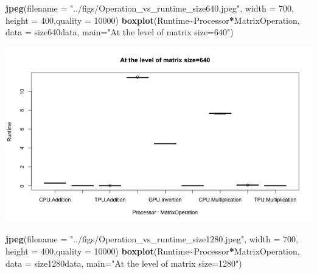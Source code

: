 \documentclass[
]{article}
\newenvironment{Shaded}{\begin{snugshade}}{\end{snugshade}}
\newcommand{\DataTypeTok}[1]{\textcolor[rgb]{0.13,0.29,0.53}{#1}}
\newcommand{\DecValTok}[1]{\textcolor[rgb]{0.00,0.00,0.81}{#1}}
\newcommand{\KeywordTok}[1]{\textcolor[rgb]{0.13,0.29,0.53}{\textbf{#1}}}
\newcommand{\NormalTok}[1]{#1}
\newcommand{\OperatorTok}[1]{\textcolor[rgb]{0.81,0.36,0.00}{\textbf{#1}}}
\newcommand{\StringTok}[1]{\textcolor[rgb]{0.31,0.60,0.02}{#1}}
\begin{document}
\begin{Shaded}
\begin{Highlighting}[]
\KeywordTok{jpeg}\NormalTok{(}\DataTypeTok{filename =} \StringTok{"../figs/Operation\_vs\_runtime\_size640.jpeg"}\NormalTok{, }\DataTypeTok{width =} \DecValTok{700}\NormalTok{, }\DataTypeTok{height =} \DecValTok{400}\NormalTok{,}\DataTypeTok{quality =} \DecValTok{10000}\NormalTok{)}
\KeywordTok{boxplot}\NormalTok{(Runtime}\OperatorTok{\textasciitilde{}}\NormalTok{Processor}\OperatorTok{*}\NormalTok{MatrixOperation, }\DataTypeTok{data =}\NormalTok{ size640data, }\DataTypeTok{main=}\StringTok{"At the level of matrix size=640"}\NormalTok{)}
\end{Highlighting}
\end{Shaded}

\begin{center}\includegraphics[width=0.9\linewidth]{../figs/Operation_vs_runtime_size640} \end{center}

\begin{Shaded}
\begin{Highlighting}[]
\KeywordTok{jpeg}\NormalTok{(}\DataTypeTok{filename =} \StringTok{"../figs/Operation\_vs\_runtime\_size1280.jpeg"}\NormalTok{, }\DataTypeTok{width =} \DecValTok{700}\NormalTok{, }\DataTypeTok{height =} \DecValTok{400}\NormalTok{,}\DataTypeTok{quality =} \DecValTok{10000}\NormalTok{)}
\KeywordTok{boxplot}\NormalTok{(Runtime}\OperatorTok{\textasciitilde{}}\NormalTok{Processor}\OperatorTok{*}\NormalTok{MatrixOperation, }\DataTypeTok{data =}\NormalTok{ size1280data, }\DataTypeTok{main=}\StringTok{"At the level of matrix size=1280"}\NormalTok{)}
\end{Highlighting}
\end{Shaded}
\end{document}

